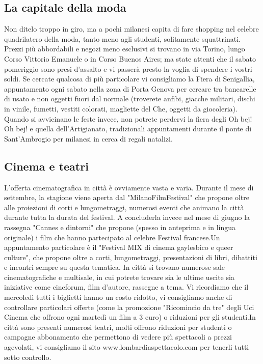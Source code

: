\subsection{La capitale della moda}
Non ditelo troppo in giro, ma a pochi milanesi capita di fare shopping nel celebre quadrilatero della moda, tanto meno agli studenti, solitamente squattrinati. Prezzi più abbordabili e negozi meno esclusivi si trovano in via Torino, lungo Corso Vittorio Emanuele o in Corso Buenos Aires; ma state attenti che il sabato pomeriggio sono presi d'assalto e vi passerà presto la voglia di spendere i vostri soldi. Se cercate qualcosa di più particolare vi consigliamo la Fiera di Senigallia, appuntamento ogni sabato nella zona di Porta Genova per cercare tra bancarelle di usato e non oggetti fuori dal normale (troverete anfibi, giacche militari, dischi in vinile, fumetti, vestiti colorati, magliette del Che, oggetti da giocoleria).
Quando si avvicinano le feste invece, non potrete perdervi la fiera degli Oh bej! Oh bej! e quella dell'Artigianato, tradizionali appuntamenti durante il ponte di Sant'Ambrogio per milanesi in cerca di regali natalizi.

\subsection{Cinema e teatri}
L'offerta cinematografica in città è ovviamente vasta e varia. Durante il mese di settembre, la stagione viene aperta dal "MilanoFilmFestival" che propone oltre alle proiezioni di corti e lungometraggi, numerosi eventi che animano la città durante tutta la durata del festival. A concluderla invece nel mese di giugno la rassegna "Cannes e dintorni" che propone (spesso in anteprima e in lingua originale) i film che hanno partecipato al celebre Festival francese.Un appuntamento particolare è il "Festival MIX di cinema gaylesbico e queer culture", che propone oltre a corti, lungometraggi, presentazioni di libri, dibattiti e incontri sempre su questa tematica.
In città si trovano numerose sale cinematografiche e multisale, in cui potrete trovare sia le ultime uscite sia iniziative come cineforum, film d'autore, rassegne a tema. Vi ricordiamo che il mercoledì tutti i biglietti hanno un costo ridotto, vi consigliamo anche di controllare particolari offerte (come la promozione "Ricomincio da tre" degli Uci Cinema che offrono ogni martedì un film a 3 euro) o riduzioni per gli studenti.In città sono presenti numerosi teatri, molti offrono riduzioni per studenti o campagne abbonamento che permettono di vedere più spettacoli a prezzi agevolati, vi consigliamo il sito www.lombardiaspettacolo.com per tenerli tutti sotto controllo.

